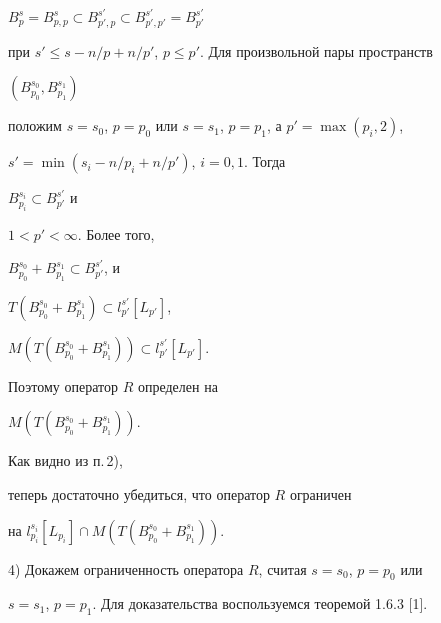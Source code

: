 $B^s_p=B^s_{p,p}\subset B^{s'}_{p',p}\subset B^{s'}_{p',p'}= 


B^{s'}_{p'}$ 


при $s'\le s-n/p+n/p'$, $p\le p'$. Для произвольной пары пространств 


$(B^{s_0}_{p_0},B^{s_1}_{p_1})$ 


положим $s=s_0$, $p=p_0$ или $s=s_1$, $p=p_1$, а $p'=\max(p_i,2)$, 


$s'=\min(s_i-n/p_i+n/p')$, $i=0,1$. Тогда 


$B^{s_i}_{p_i}\subset B^{s'}_{p'}$ и 


$1<p'<\infty$. Более того, 


$B^{s_0}_{p_0}+B^{s_1}_{p_1}\subset B^{s'}_{p'}$, и 


$T(B^{s_0}_{p_0}+B^{s_1}_{p_1})\subset l^{s'}_{p'}[L_{p'}]$, 


$M(T(B^{s_0}_{p_0}+B^{s_1}_{p_1}))\subset l^{s'}_{p'}[L_{p'}]$. 


Поэтому оператор $R$ определен на 


$M(T(B^{s_0}_{p_0}+B^{s_1}_{p_1}))$. 


Как видно из п.\,2), 


теперь достаточно убедиться, что оператор $R$ ограничен 


на $l^{s_i}_{p_i}[L_{p_i}]\cap M(T 


(B^{s_0}_{p_0}+B^{s_1}_{p_1}))$. 


 


4) Докажем ограниченность оператора $R$, считая $s=s_0$, $p=p_0$ или  


$s=s_1$, $p=p_1$. Для доказательства воспользуемся теоремой 1.6.3 [1]. 


\medskip 


 


